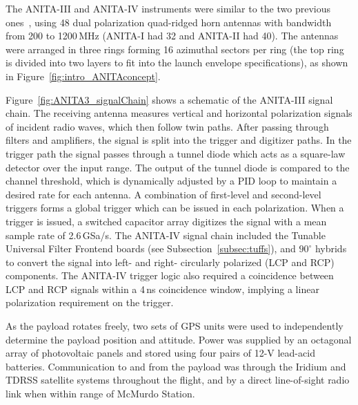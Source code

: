 The ANITA-III and ANITA-IV instruments were similar to the two previous
ones~\cite{ANITA1paper,ANITA2paper}, using 48 dual polarization quad-ridged horn antennas with bandwidth from 200 to 1200\,MHz (ANITA-I had 32 and ANITA-II had 40). 
The antennas were arranged in three rings forming 16 azimuthal sectors per ring (the top ring is divided into two layers to fit into the launch envelope specifications), as shown in Figure~\ref{fig:intro_ANITAconcept}.

Figure~\ref{fig:ANITA3_signalChain} shows a schematic of the ANITA-III signal chain. 
The receiving antenna measures vertical and horizontal polarization signals of incident radio waves, which then follow twin paths. 
After passing through filters and amplifiers, the signal is split into
the trigger and digitizer paths.
In the trigger path the signal passes
through a tunnel diode which acts as a square-law detector over the
input range. The output of the tunnel diode is compared to the channel
threshold, which is dynamically adjusted by a PID loop to maintain a desired 
rate for each antenna. A combination of first-level and second-level triggers forms a
global trigger which can be issued in each polarization.
When a trigger is issued, a switched capacitor array digitizes the signal with a mean sample rate of 2.6\,GSa/s. 
The ANITA-IV signal chain included the Tunable Universal Filter Frontend boards (see Subsection~\ref{subsec:tuffs}), and $90^{\circ}$ hybrids to convert the signal into left- and right- circularly polarized (LCP and RCP) components. 
The ANITA-IV trigger logic also required a coincidence between LCP and RCP signals within a 4\,ns coincidence window, implying a linear polarization requirement on the trigger. 

As the payload rotates freely, two sets of GPS units were used to independently determine the
payload position and attitude.
Power was supplied by an octagonal array of photovoltaic panels and stored using four pairs of 12-V lead-acid batteries.
Communication to and from the payload was through the Iridium and TDRSS satellite systems throughout the flight, and by a direct line-of-sight radio link when within range of McMurdo Station.


